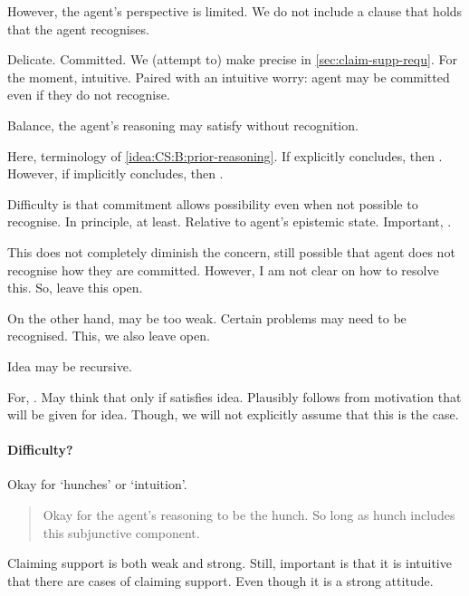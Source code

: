 \begin{note}
  However, the agent's perspective is limited.
  We do not include a clause that holds that the agent recognises.

  Delicate.
  Committed.
  We (attempt to) make precise in \autoref{sec:claim-supp-requ}.
  For the moment, intuitive.
  Paired with an intuitive worry: agent may be committed even if they do not recognise.

  Balance, the agent's reasoning may satisfy without recognition.

  Here,  terminology of \ref{idea:CS:B:prior-reasoning}.
  If explicitly concludes, then .
  However, if implicitly concludes, then .

  Difficulty is that commitment allows possibility even when not possible to recognise.
  In principle, at least.
  Relative to agent's epistemic state.
  Important, \ep{}.

  This does not completely diminish the concern, still possible that agent does not recognise how they are committed.
  However, I am not clear on how to resolve this.
  So, leave this open.

  On the other hand,  may be too weak.
  Certain problems may need to be recognised.
  This, we also leave open.
\end{note}

\begin{note}
  Idea may be recursive.

  For, .
  May think that  only if satisfies idea.
  Plausibly follows from motivation that will be given for idea.
  Though, we will not explicitly assume that this is the case.
\end{note}




\paragraph{Difficulty?}

\begin{note}
  Okay for `hunches' or `intuition'.
    \begin{quote}
    Okay for the agent's reasoning to be the hunch.
    So long as hunch includes this subjunctive component.
  \end{quote}

\end{note}

\begin{note}
  Claiming support is both weak and strong.
  Still, important is that it is intuitive that there are cases of claiming support.
  Even though it is a strong attitude.
\end{note}

